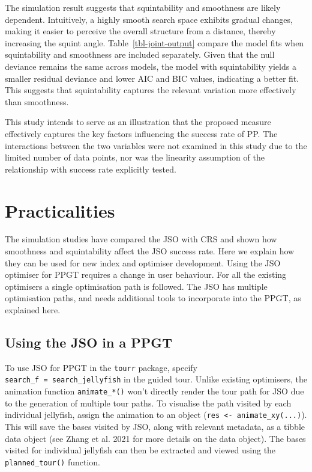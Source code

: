 \documentclass[
  12pt,
]{interact}
\theoremstyle{plain}
\begin{document}
\endgroup{}

The simulation result suggests that squintability and smoothness are
likely dependent. Intuitively, a highly smooth search space exhibits
gradual changes, making it easier to perceive the overall structure from
a distance, thereby increasing the squint angle.
Table~\ref{tbl-joint-output} compare the model fits when squintability
and smoothness are included separately. Given that the null deviance
remains the same across models, the model with squintability yields a
smaller residual deviance and lower AIC and BIC values, indicating a
better fit. This suggests that squintability captures the relevant
variation more effectively than smoothness.

This study intends to serve as an illustration that the proposed measure
effectively captures the key factors influencing the success rate of PP.
The interactions between the two variables were not examined in this
study due to the limited number of data points, nor was the linearity
assumption of the relationship with success rate explicitly tested.

\section{Practicalities}\label{sec-discussion}

The simulation studies have compared the JSO with CRS and shown how
smoothness and squintability affect the JSO success rate. Here we
explain how they can be used for new index and optimiser development.
Using the JSO optimiser for PPGT requires a change in user behaviour.
For all the existing optimisers a single optimisation path is followed.
The JSO has multiple optimisation paths, and needs additional tools to
incorporate into the PPGT, as explained here.

\subsection{Using the JSO in a PPGT}\label{using-the-jso-in-a-ppgt}

To use JSO for PPGT in the \texttt{tourr} package, specify
\texttt{search\_f\ =\ search\_jellyfish} in the guided tour. Unlike
existing optimisers, the animation function \texttt{animate\_*()} won't
directly render the tour path for JSO due to the generation of multiple
tour paths. To visualise the path visited by each individual jellyfish,
assign the animation to an object
(\texttt{res\ \textless{}-\ animate\_xy(...)}). This will save the bases
visited by JSO, along with relevant metadata, as a tibble data object
(see Zhang et al. 2021 for more details on the data object). The bases
visited for individual jellyfish can then be extracted and viewed using
the \texttt{planned\_tour()} function.
\end{document}
